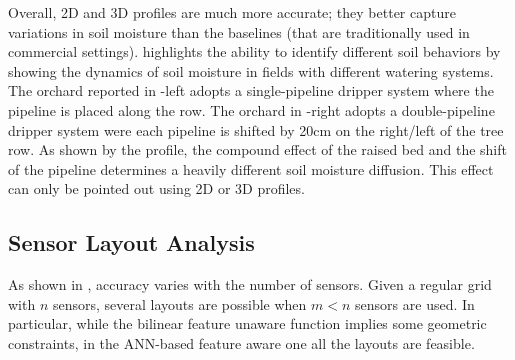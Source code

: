 Overall, 2D and 3D profiles are much more accurate; they better capture variations in soil moisture than the baselines (that are traditionally used in commercial settings).  highlights the ability to identify different soil behaviors by showing the dynamics of soil moisture in fields with different watering systems. The orchard reported in -left adopts a single-pipeline dripper system where the pipeline is placed along the row. 
The orchard in -right adopts a double-pipeline dripper system were each pipeline is shifted by 20cm on the right/left of the tree row.
As shown by the profile, the compound effect of the raised bed and the shift of the pipeline determines a heavily different soil moisture diffusion.
This effect can only be pointed out using 2D or 3D profiles.

\subsection{Sensor Layout Analysis}
\label{pluto-sec:sensors_disposal_evaluation}
As shown in , accuracy varies with the number of sensors. 
Given a regular grid with $n$ sensors, several layouts are possible when $m<n$ sensors are used.  
In particular, while the bilinear feature unaware function implies some geometric constraints, in the ANN-based feature aware one all the layouts are feasible.

